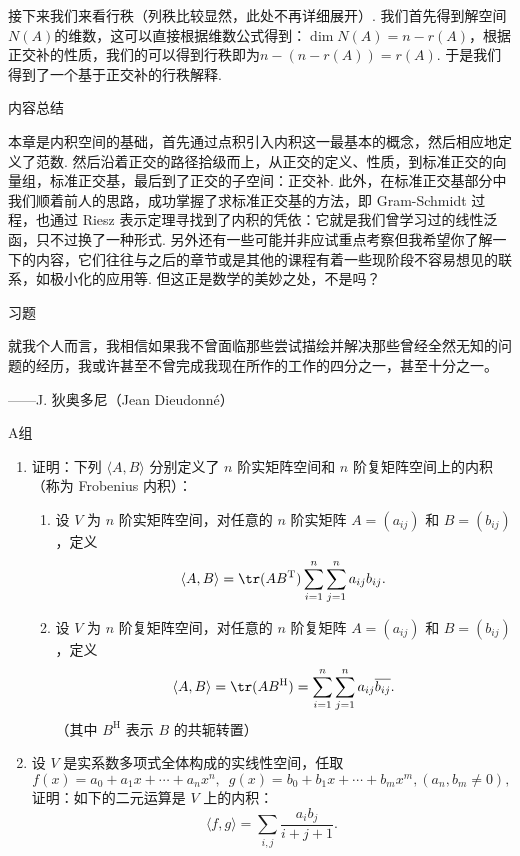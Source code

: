 接下来我们来看行秩（列秩比较显然，此处不再详细展开）. 我们首先得到解空间$N(A)$的维数，这可以直接根据维数公式得到：$\dim N(A) = n-r(A)$，根据正交补的性质，我们的可以得到行秩即为$n-(n-r(A))=r(A)$. 于是我们得到了一个基于正交补的行秩解释.

\vspace{2ex}
\centerline{\heiti \Large 内容总结}

本章是内积空间的基础，首先通过点积引入内积这一最基本的概念，然后相应地定义了范数. 然后沿着正交的路径拾级而上，从正交的定义、性质，到标准正交的向量组，标准正交基，最后到了正交的子空间：正交补. 此外，在标准正交基部分中我们顺着前人的思路，成功掌握了求标准正交基的方法，即 Gram-Schmidt 过程，也通过 Riesz 表示定理寻找到了内积的凭依：它就是我们曾学习过的线性泛函，只不过换了一种形式. 另外还有一些可能并非应试重点考察但我希望你了解一下的内容，它们往往与之后的章节或是其他的课程有着一些现阶段不容易想见的联系，如极小化的应用等. 但这正是数学的美妙之处，不是吗？

\vspace{2ex}
\centerline{\heiti \Large 习题}

\vspace{2ex}
{\kaishu 就我个人而言，我相信如果我不曾面临那些尝试描绘并解决那些曾经全然无知的问题的经历，我或许甚至不曾完成我现在所作的工作的四分之一，甚至十分之一。}
\begin{flushright}
    \kaishu
    ——J. 狄奥多尼（Jean Dieudonné）
\end{flushright}

\centerline{\heiti A组}
\begin{enumerate}
    \item 证明：下列 $\langle A, B \rangle$ 分别定义了 $n$ 阶实矩阵空间和 $n$ 阶复矩阵空间上的内积（称为 Frobenius 内积）：
          \begin{enumerate}
            \item 设 $V$ 为 $n$ 阶实矩阵空间，对任意的 $n$ 阶实矩阵 $A = (a_{ij})$ 和 $B = (b_{ij})$，定义
                    \[
                        \langle A, B \rangle = \tr(A B^{\mathrm{T}}) \sum_{i = 1}^{n} \sum_{j = 1}^{n} a_{ij}b_{ij}.
                    \]
            \item 设 $V$ 为 $n$ 阶复矩阵空间，对任意的 $n$ 阶复矩阵 $A = (a_{ij})$ 和 $B = (b_{ij})$，定义
                \[
                    \langle A, B \rangle = \tr(A B^{\mathrm{H}}) = \sum_{i = 1}^{n} \sum_{j = 1}^{n} a_{ij}\overline{b_{ij}}.
                \]
                （其中 $B^{\mathrm{H}}$ 表示 $B$ 的共轭转置）
          \end{enumerate}
    \item 设 $V$ 是实系数多项式全体构成的实线性空间，任取
          \[ f(x) = a_0 + a_1 x + \cdots + a_n x^n, \enspace g(x) = b_0 + b_1 x + \cdots + b_m x^m, (a_n, b_m \neq 0), \]
          证明：如下的二元运算是 $V$ 上的内积：
          \[ \langle f, g \rangle = \sum_{i, j} \dfrac{a_i b_j}{i + j + 1}. \]
\end{enumerate}


